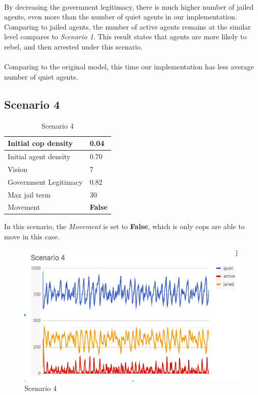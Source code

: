 \documentclass[11pt]{article}
\begin{document}
      \paragraph{}
      By decreasing the government legitimacy, there is much higher number of 
      jailed agents, even more than the number of quiet agents in our implementation.
      Comparing to jailed agents, the number of active agents remains at the similar
      level compares to \textit{Scenario 1}. This result states that agents are
      more likely to rebel, and then arrested under this scenario.
      \paragraph{}
      Comparing to the original model, this time our implementation has less average
      number of quiet agents. %

      \subsection{Scenario 4}
      \begin{table}[ht]
        \begin{center}
          \begin{tabular}{|l|l|}
          \hline
            Initial cop density & 0.04 \\
          \hline
            Initial agent density & 0.70 \\
          \hline
            Vision & 7 \\
          \hline
            Government Legitimacy & 0.82 \\
          \hline
            Max jail term & 30 \\
          \hline
            Movement & \textbf{False} \\
          \hline
          \end{tabular}
          \caption{Scenario 4}\label{table4}
        \end{center}
      \end{table}
      In this scenario, the \textit{Movement} is set to \textbf{False}, which is
      only cops are able to move in this case.
      \begin{figure}[h!]
        \includegraphics[width=\linewidth]{Scenario_4.png}
        \caption{Scenario 4}
        \label{fig:scenario}
      \end{figure}
\end{document}
